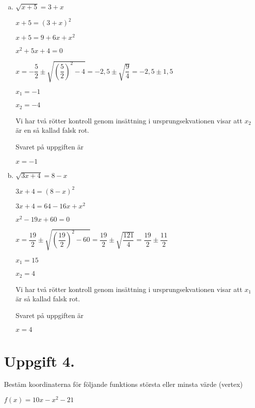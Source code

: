 \documentclass{article}
\begin{document}
\begin{enumerate}[(a)]
\item
$\sqrt{x+5}=3+x$

$x+5=(3+x)^2$

$x+5=9+6x+x^2$

$x^2+5x+4=0$

$x=-\dfrac{5}{2}\pm\sqrt{\left(\dfrac{5}{2}\right)^2-4}=-2,5\pm\sqrt{\dfrac{9}{4}}=-2,5\pm1,5$

$x_1 = -1$

$x_2 = -4$

Vi har två rötter kontroll genom insättning i ursprungsekvationen visar att $x_2$ är en så kallad falsk rot.

Svaret på uppgiften är 

$x = -1$

\item
$\sqrt{3x+4}=8-x$

$3x+4=(8-x)^2$

$3x+4=64-16x+x^2$

$x^2-19x+60=0$

$x=\dfrac{19}{2}\pm\sqrt{\left(\dfrac{19}{2}\right)^2-60}=\dfrac{19}{2}\pm\sqrt{\dfrac{121}{4}}=\dfrac{19}{2}\pm\dfrac{11}{2}$

$x_1 = 15$

$x_2 = 4$

Vi har två rötter kontroll genom insättning i ursprungsekvationen visar att $x_1$ är så kallad falsk rot.

Svaret på uppgiften är 

$x = 4$
\end{enumerate}

\section*{Uppgift 4.}
Bestäm koordinaterna för följande funktions största eller minsta värde (vertex)

$f(x)=10x-x^2-21$
\end{document}
